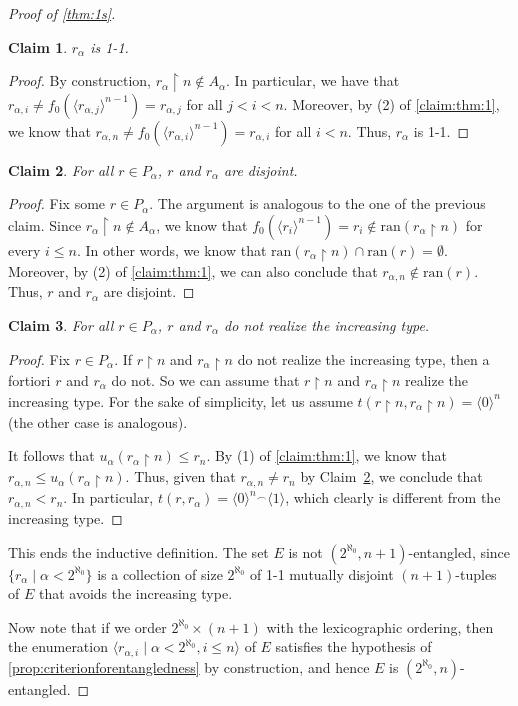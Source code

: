 \documentclass[12pt]{amsart}
\newtheorem{claim}{Claim}[theorem]
\theoremstyle{definition}
\theoremstyle{remark}
\begin{document}
\begin{proof}[Proof of \cref{thm:1s}]
{\begin{claim}
$r_\alpha$ is 1-1.
\end{claim}
\begin{proof}
By construction, $r_\alpha \upharpoonright n \not\in A_\alpha$. In particular, we have that $r_{\alpha, i} \neq f_0(\langle r_{\alpha, j}\rangle^{n-1}) = r_{\alpha, j}$ for all $j < i < n$. Moreover, by (2) of \cref{claim:thm:1}, we know that $r_{\alpha, n} \neq  f_0(\langle r_{\alpha, i}\rangle^{n-1}) = r_{\alpha, i}$ for all $i < n$. Thus, $r_\alpha$ is 1-1.
\end{proof}
\begin{claim}\label{claim.2}
For all $r \in P_\alpha$, $r$ and $r_\alpha$ are disjoint.
\end{claim}
\begin{proof}
Fix some $r \in P_\alpha$. The argument is analogous to the one of the previous claim. Since $r_\alpha \upharpoonright n \not\in A_\alpha$, we know that $f_0(\langle r_i\rangle^{n-1}) = r_i \not\in \mathrm{ran}(r_\alpha \upharpoonright n)$ for every $i \le n$. In other words, we know that $\mathrm{ran}(r_\alpha \upharpoonright n) \cap \mathrm{ran}(r) = \emptyset$. 
Moreover, by (2) of \cref{claim:thm:1}, we can also conclude that $r_{\alpha, n} \not\in \mathrm{ran}(r)$. Thus, $r$ and $r_\alpha$ are disjoint.
\end{proof}

\begin{claim}
For all $r \in P_\alpha$, $r$ and $r_\alpha$ do not realize the increasing type.
\end{claim}
\begin{proof}
Fix $r \in P_\alpha$. If $r \upharpoonright n$ and $r_\alpha \upharpoonright n$ do not realize the increasing type, then a fortiori $r$ and $r_\alpha$ do not. So we can assume that $r \upharpoonright n$ and $r_\alpha \upharpoonright n$ realize the increasing type. For the sake of simplicity, let us assume $t(r \upharpoonright n, r_\alpha \upharpoonright n) = \langle 0 \rangle^{n}$ (the other case is analogous).

It follows that $u_\alpha(r_\alpha \upharpoonright n) \le r_n$. By (1) of \cref{claim:thm:1}, we know that $r_{\alpha, n} \le u_\alpha(r_\alpha \upharpoonright n)$. Thus, given that $r_{\alpha, n} \neq r_n$ by Claim~\ref{claim.2}, we conclude that $r_{\alpha, n} < r_n$. In particular, $t(r, r_\alpha) = \langle 0\rangle^n{}^\smallfrown \langle 1\rangle$, which clearly is different from the increasing type.
\end{proof}

This ends the inductive definition. The set $E$ is not $(2^{\aleph_0}, n+1)$-entangled, since $\{r_\alpha \mid \alpha < 2^{\aleph_0}\}$ is a collection of size $2^{\aleph_0}$ of 1-1 mutually disjoint $(n+1)$-tuples of $E$ that avoids the increasing type. } Now note that if we order $2^{\aleph_0} \times (n+1)$ with the lexicographic ordering, then the enumeration $\langle r_{\alpha, i} \mid \alpha < 2^{\aleph_0}, i \le n\rangle$ of $E$ satisfies the hypothesis of \cref{prop:criterionforentangledness} by construction, and hence $E$ is $(2^{\aleph_0}, n)$-entangled.
\end{proof}
\end{document}
